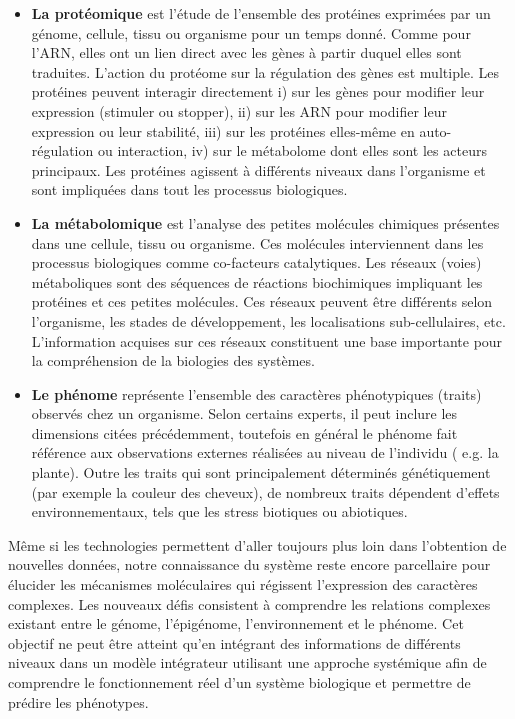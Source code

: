 \begin{itemize}
    \item \textbf{La protéomique} est l'étude de l'ensemble des protéines exprimées par un génome, cellule, tissu ou organisme pour un temps donné. Comme pour l'ARN, elles ont un lien direct avec les gènes à partir duquel elles sont traduites. L'action du protéome sur la régulation des gènes est multiple. Les protéines peuvent interagir directement i)  sur les gènes pour modifier leur expression (stimuler ou stopper), ii) sur les ARN pour modifier leur expression ou leur stabilité, iii) sur les protéines elles-même en auto-régulation ou interaction, iv) sur le métabolome dont elles sont les acteurs principaux. Les protéines agissent à différents niveaux dans l'organisme et sont impliquées dans tout les processus biologiques.  \\
    
    \item \textbf{La métabolomique} est l'analyse des petites molécules chimiques présentes dans une cellule, tissu ou organisme. Ces molécules interviennent dans les processus biologiques comme co-facteurs catalytiques. Les réseaux (voies) métaboliques sont des séquences de réactions biochimiques impliquant les protéines et ces petites molécules. Ces réseaux peuvent être différents selon l'organisme, les stades de développement, les localisations sub-cellulaires, etc. L'information acquises sur ces réseaux constituent une base importante pour la compréhension de la biologies des systèmes.\\
    
    \item \textbf{Le phénome} représente l'ensemble des caractères phénotypiques (traits) observés chez un organisme. Selon certains experts, il peut inclure les dimensions citées précédemment, toutefois en général le phénome fait référence aux observations externes réalisées au niveau de l'individu ( e.g. la plante). Outre les traits qui sont principalement déterminés génétiquement (par exemple la couleur des cheveux), de nombreux traits dépendent d'effets environnementaux, tels que les stress biotiques ou abiotiques.\\
\end{itemize}


 
Même si les technologies permettent d'aller toujours plus loin dans l'obtention de nouvelles données, notre connaissance du système reste encore parcellaire pour élucider les mécanismes moléculaires qui régissent l'expression des caractères complexes. Les nouveaux défis consistent à comprendre les relations complexes existant entre le génome, l'épigénome, l'environnement et le phénome. Cet objectif ne peut être atteint qu'en intégrant des informations de différents niveaux dans un modèle intégrateur utilisant une approche systémique afin de comprendre le fonctionnement réel d'un système biologique et permettre de prédire les phénotypes. 
